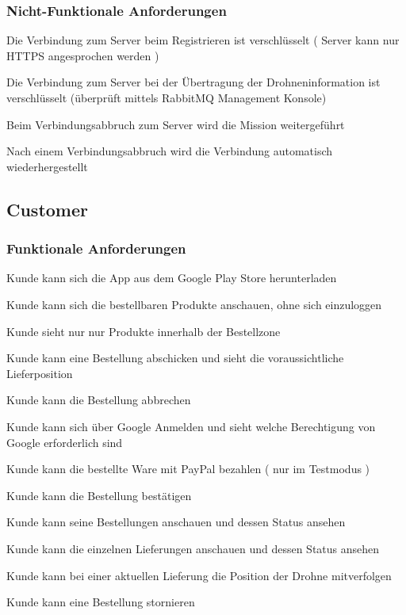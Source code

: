 \subsubsection{Nicht-Funktionale Anforderungen}
\begin{todolist}
	\item[\done] Die Verbindung zum Server beim Registrieren ist verschlüsselt ( Server kann nur HTTPS angesprochen werden )
	\item[\done] Die Verbindung zum Server bei der Übertragung der Drohneninformation ist verschlüsselt (überprüft mittels RabbitMQ Management Konsole)
	\item[\done] Beim Verbindungsabbruch zum Server wird die Mission weitergeführt
	\item[\done] Nach einem Verbindungsabbruch wird die Verbindung automatisch wiederhergestellt
\end{todolist}

\subsection{Customer}
\subsubsection{Funktionale Anforderungen}
\begin{todolist}
	\item Kunde kann sich die App aus dem Google Play Store herunterladen 
	\item[\done] Kunde kann sich die bestellbaren Produkte anschauen, ohne sich einzuloggen
	\item[\done] Kunde sieht nur nur Produkte innerhalb der Bestellzone
	\item[\done] Kunde kann eine Bestellung abschicken und sieht die voraussichtliche Lieferposition
	\item[\done] Kunde kann die Bestellung abbrechen
	\item[\done] Kunde kann sich über Google Anmelden und sieht welche Berechtigung von Google erforderlich sind
	\item[\done] Kunde kann die bestellte Ware mit PayPal bezahlen ( nur im Testmodus )
	\item[\done] Kunde kann die Bestellung bestätigen
	\item[\done] Kunde kann seine Bestellungen anschauen und dessen Status ansehen
	\item[\done] Kunde kann die einzelnen Lieferungen anschauen und dessen Status ansehen
	\item[\done] Kunde kann bei einer aktuellen Lieferung die Position der Drohne mitverfolgen
	\item Kunde kann eine Bestellung stornieren 
\end{todolist}

